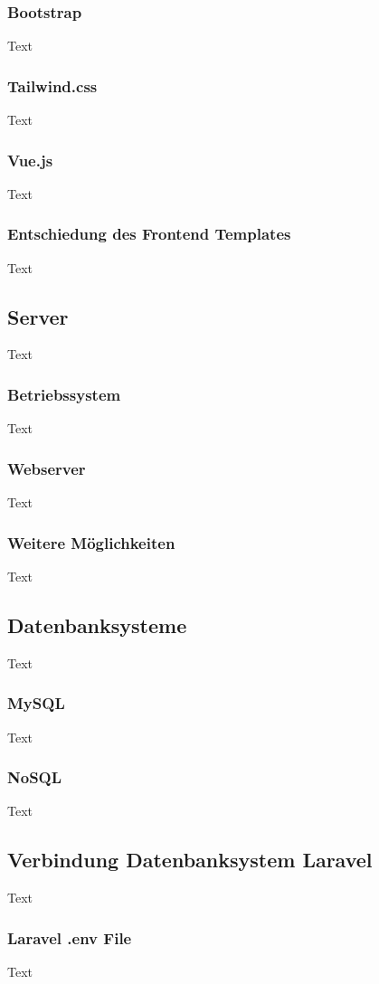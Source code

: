 \subsubsection{Bootstrap}
Text
\subsubsection{Tailwind.css}
Text
\subsubsection{Vue.js}
Text
\subsubsection{Entschiedung des Frontend Templates}
Text

\subsection{Server}
Text
\subsubsection{Betriebssystem}
Text
\subsubsection{Webserver}
Text
\subsubsection{Weitere Möglichkeiten}
Text

\subsection{Datenbanksysteme}
Text
\subsubsection{MySQL}
Text
\subsubsection{NoSQL}
Text

\subsection{Verbindung Datenbanksystem Laravel}
Text
\subsubsection{Laravel .env File }
Text
